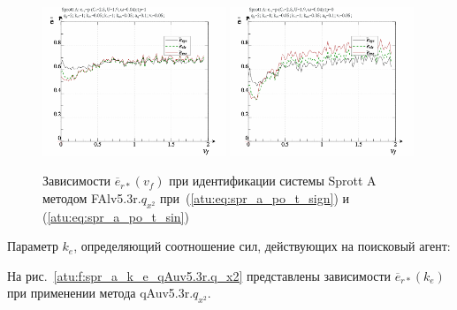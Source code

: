 \begin{figure}[h!]
  \centerline{
    \includegraphics[width=0.49\textwidth]{p/cha/spr_a/FAlv5.3A/sprott_a_FAlv5x3r-p_v_f_e_sign.png}
    \hfill
    \includegraphics[width=0.49\textwidth]{p/cha/spr_a/FAlv5.3A/sprott_a_FAlv5x3r-p_v_f_e_sin.png}
  }
  \caption{Зависимости $\overline{e}_{r*}(v_f)$ при идентификации системы Sprott A методом FAlv5.3r.$q_{x^2}$
   при~(\ref{atu:eq:spr_a_po_t_sign}) и (\ref{atu:eq:spr_a_po_t_sin})}
  \label{atu:f:spr_a_v_f_FAlv5.3r.q_x2}
\end{figure}

Параметр $k_e$, определяющий соотношение сил, действующих
на поисковый агент:


На рис.~\ref{atu:f:spr_a_k_e_qAuv5.3r.q_x2} представлены зависимости
$\overline{e}_{r*}(k_e)$ при применении метода qAuv5.3r.$q_{x^2}$.

